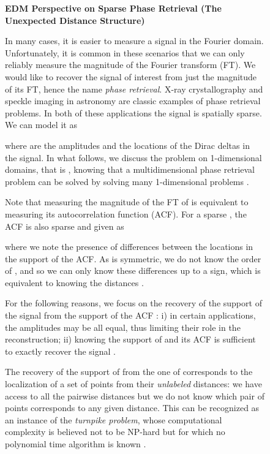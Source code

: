 \documentclass[10pt,double]{IEEEtran}
\begin{document}
\begin{figure*}[t]
\selectfont
\begin{spmagbox}
\textbf{EDM Perspective on Sparse Phase Retrieval (The Unexpected Distance Structure)}
\\
\label{sub:box_phase_retrieval_by_edms}
\fontsize{9pt}{10pt}\selectfont
\begin{multicols}{2}

In many cases, it is easier to measure a signal in the Fourier domain.
Unfortunately, it is common in these scenarios that we can only reliably
measure the magnitude of the Fourier transform (FT). We would like to recover
the signal of interest from just the magnitude of its FT, hence the name
\emph{phase retrieval}. X-ray crystallography
\cite{Millane:1990pt} and speckle imaging in astronomy
\cite{Beavers:1989tj} are classic examples of phase retrieval problems. In
both of these applications the signal is spatially sparse. We can model it as

 

where  are the amplitudes and   the locations of the  Dirac
deltas in the signal. In what follows, we discuss the problem on
1-dimensional domains, that is , knowing that a multidimensional
phase retrieval problem can be solved by solving many 1-dimensional problems
\cite{Ranieri:2013tx}.

Note that measuring the magnitude of the FT of  is equivalent to
measuring its autocorrelation function (ACF). For a sparse , the ACF
is also sparse and given as

where we note the presence of differences between the locations  in the
support of the ACF. As  is symmetric, we do not know the order of
, and so we can only know these differences up to a sign, which is
equivalent to knowing the distances .

For the following reasons, we focus on the recovery of the support of the
signal  from the support of the ACF : i) in certain
applications, the amplitudes  may be all equal, thus limiting their role
in the reconstruction; ii) knowing the support of  and its ACF
is sufficient to exactly recover the signal 
\cite{Ranieri:2013tx}. 

The recovery of the support of  from the one of  corresponds
to the localization of a set of  points from their \emph{unlabeled}
distances: we have access to all the pairwise distances but we do not know
which pair of points corresponds to any given distance. This can be recognized
as an instance of the \emph{turnpike problem}, whose computational complexity
is believed not to be NP-hard but for which no polynomial time algorithm is
known \cite{Lemke:2002um}.


\end{multicols}
\end{spmagbox}
\end{figure*}
\end{document}
